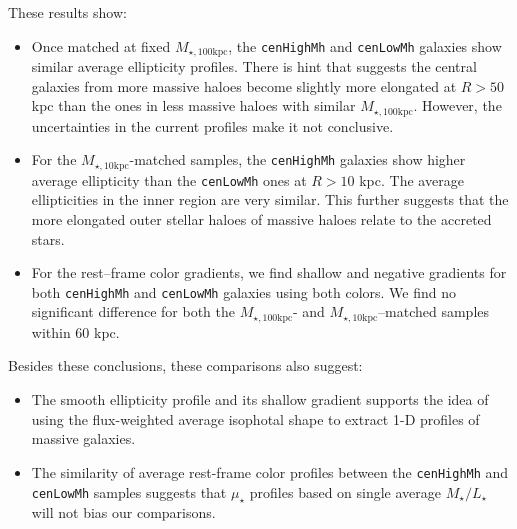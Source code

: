 \documentclass[a4paper,fleqn,usenatbib]{mnras}
\def\rbcg{\texttt{cenHighMh}}
\def\nbcg{\texttt{cenLowMh}}
\def\minn{{$M_{\star,10\mathrm{kpc}}$}}
\def\mtot{{$M_{\star,100\mathrm{kpc}}$}}
\def\m2l{{$M_{\star}/L_{\star}$}}
\def\mden{{$\mu_{\star}$}}
\begin{document}
    These results show: 
    
    \begin{itemize}
        
        \item Once matched at fixed \mtot{}, the \rbcg{} and \nbcg{} galaxies 
            show similar average ellipticity profiles. 
            There is hint that suggests the central galaxies from more massive 
            haloes become slightly more elongated at $R>50$ kpc than the ones 
            in less massive haloes with similar \mtot{}. 
            However, the uncertainties in the current profiles make it not 
            conclusive. 
            
        \item For the \minn{}-matched samples, the \rbcg{} galaxies show higher
            average ellipticity than the \nbcg{} ones at $R > 10$ kpc. 
            The average ellipticities in the inner region are very similar. 
            This further suggests that the more elongated outer stellar haloes 
            of massive haloes relate to the accreted stars. 
            
        \item For the rest--frame color gradients, we find shallow and negative 
            gradients for both \rbcg{} and \nbcg{} galaxies using both colors.
            We find no significant difference for both the \mtot{}- and 
            \minn{}--matched samples within 60 kpc. 
    
    \end{itemize}
    
    Besides these conclusions, these comparisons also suggest: 
    
    \begin{itemize}
    
        \item The smooth ellipticity profile and its shallow gradient supports 
            the idea of using the flux-weighted average isophotal shape to 
            extract 1-D profiles of massive galaxies. 
            
        \item The similarity of average rest-frame color profiles between the 
            \rbcg{} and \nbcg{} samples suggests that \mden{} profiles based on 
            single average \m2l{} will not bias our comparisons. 
    
    \end{itemize}
   
\end{document}
